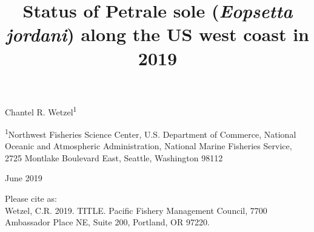 \documentclass[12pt,]{article}
\title{Status of Petrale sole (\emph{Eopsetta jordani}) along the US west coast
in 2019}
\author{}
\date{}
\begin{document}
\maketitle


\begin{center}
\thispagestyle{empty}


\vspace{.5cm}




Chantel R. Wetzel\textsuperscript{1}\\


\vspace{.5cm}

\small
\textsuperscript{1}Northwest Fisheries Science Center, U.S. Department of Commerce, National Oceanic and Atmospheric Administration, National Marine Fisheries Service, 2725 Montlake Boulevard East, Seattle, Washington 98112\\

\vspace{.3cm}





\vspace{1cm}

\vfill
June 2019


\vspace{.3cm}

\newpage

\vspace{3cm}

Please cite as:\\

Wetzel, C.R. 2019. TITLE. Pacific Fishery Management Council, 7700 Ambassador Place NE, Suite 200, Portland, OR 97220. 

\vspace{3cm}

\maketitle






\setcounter{page}{1}
\end{center}

{
\setcounter{tocdepth}{4}
\tableofcontents
}
\setlength{\parskip}{5mm plus1mm minus1mm} \pagebreak
\end{document}
